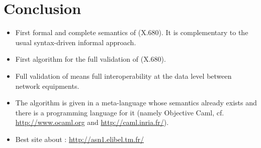 \documentclass[12pt]{article}
\begin{document}
\section{Conclusion}
\begin{slide}

\begin{itemize}

  \item First formal and complete semantics of \ASN (X.680). It is
        complementary to the usual syntax-driven informal approach.

  \item First algorithm for the full validation of \ASN (X.680).

  \item Full validation of \ASN means full interoperability at the
        data level between network equipments.

  \item The algorithm is given in a meta-language whose semantics
        already exists and there is a programming language for it
        (namely Objective Caml, cf.
        \url{http://www.ocaml.org} and \url{http://caml.inria.fr/}).

  \item Best site about \ASN: \url{http://asn1.elibel.tm.fr/}

\end{itemize}

\end{slide}
\end{document}
